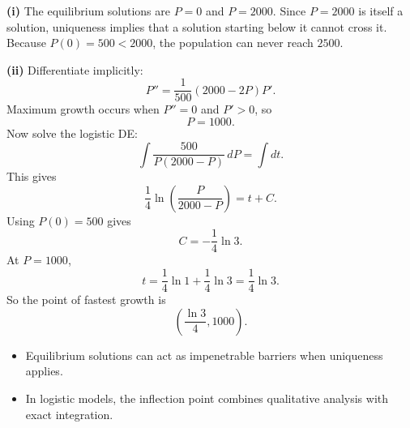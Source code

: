 \begin{solution}
\textbf{(i)} The equilibrium solutions are $P=0$ and $P=2000$. Since $P=2000$ is itself a solution, uniqueness implies that a solution starting below it cannot cross it. Because $P(0)=500<2000$, the population can never reach $2500$.

\textbf{(ii)} Differentiate implicitly:
\[
P''=\frac1{500}(2000-2P)P'.
\]
Maximum growth occurs when $P''=0$ and $P'>0$, so
\[
\boxed{P=1000}.
\]
Now solve the logistic DE:
\[
\int \frac{500}{P(2000-P)}\,dP=\int dt.
\]
This gives
\[
\frac14\ln\left(\frac{P}{2000-P}\right)=t+C.
\]
Using $P(0)=500$ gives
\[
C=-\frac14\ln3.
\]
At $P=1000$,
\[
t=\frac14\ln1+\frac14\ln3=\frac14\ln3.
\]
So the point of fastest growth is
\[
\boxed{\left(\frac{\ln3}{4},1000\right)}.
\]
\end{solution}

\begin{takeaways}
\begin{itemize}[leftmargin=*]
    \item Equilibrium solutions can act as impenetrable barriers when uniqueness applies.
    \item In logistic models, the inflection point combines qualitative analysis with exact integration.
\end{itemize}
\end{takeaways}
